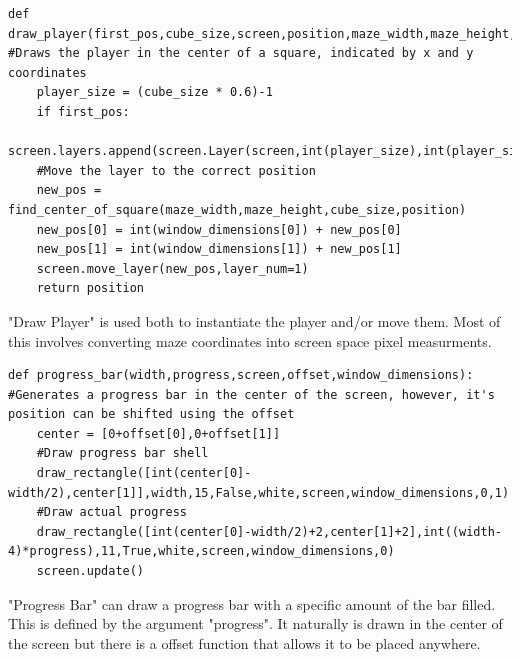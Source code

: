 \begin{lstlisting}
def draw_player(first_pos,cube_size,screen,position,maze_width,maze_height,window_dimensions): #Draws the player in the center of a square, indicated by x and y coordinates
    player_size = (cube_size * 0.6)-1
    if first_pos:
        screen.layers.append(screen.Layer(screen,int(player_size),int(player_size),255))
    #Move the layer to the correct position
    new_pos = find_center_of_square(maze_width,maze_height,cube_size,position)
    new_pos[0] = int(window_dimensions[0]) + new_pos[0] 
    new_pos[1] = int(window_dimensions[1]) + new_pos[1]
    screen.move_layer(new_pos,layer_num=1)
    return position
\end{lstlisting}
"Draw Player" is used both to instantiate the player and/or move them. Most of this involves converting maze coordinates into screen space pixel measurments. 

\begin{lstlisting}
def progress_bar(width,progress,screen,offset,window_dimensions): #Generates a progress bar in the center of the screen, however, it's position can be shifted using the offset
    center = [0+offset[0],0+offset[1]]
    #Draw progress bar shell
    draw_rectangle([int(center[0]-width/2),center[1]],width,15,False,white,screen,window_dimensions,0,1)
    #Draw actual progress
    draw_rectangle([int(center[0]-width/2)+2,center[1]+2],int((width-4)*progress),11,True,white,screen,window_dimensions,0)
    screen.update()
\end{lstlisting}
"Progress Bar" can draw a progress bar with a specific amount of the bar filled. This is defined by the argument "progress". It naturally is drawn in the center of the screen but there is a offset function that allows it to be placed anywhere.

